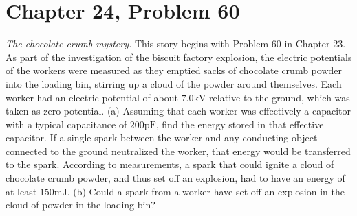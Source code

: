 \documentclass[12pt]{article}
\begin{document}
\section{Chapter 24, Problem 60}
\textit{The chocolate crumb mystery.} This story begins with Problem 60 in Chapter 23. As part of the investigation of the biscuit factory explosion, the electric potentials of the workers were measured as they emptied sacks of chocolate crumb powder into the loading bin, stirring up a cloud of the powder around themselves. Each worker had an electric potential of about $7.0 \unit{\kilo\volt}$ relative to the ground, which was taken as zero potential. (a) Assuming that each worker was effectively a capacitor with a typical capacitance of $200 \unit{\pico\farad}$, find the energy stored in that effective capacitor. If a single spark between the worker and any conducting object connected to the ground neutralized the worker, that energy would be transferred to the spark. According to measurements, a spark that could ignite a cloud of chocolate crumb powder, and thus set off an explosion, had to have an energy of at least $150 \unit{\milli\joule}$. (b) Could a spark from a worker have set off an explosion in the cloud of powder in the loading bin?
\end{document}
